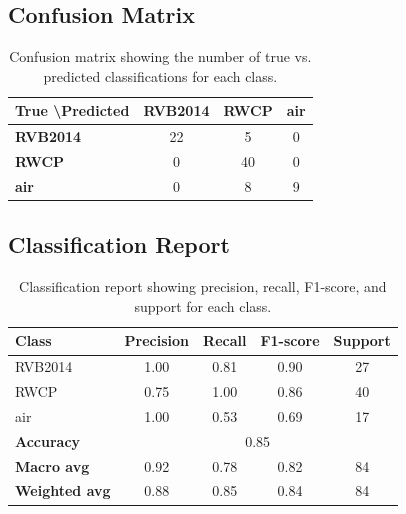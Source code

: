 \documentclass{article}
\begin{document}
\subsection{Confusion Matrix}
\begin{table}[H] %
\centering
\begin{tabular}{lccc}
\toprule
\textbf{True \textbackslash Predicted} & \textbf{RVB2014} & \textbf{RWCP} & \textbf{air} \\
\midrule
\textbf{RVB2014} & 22 & 5  & 0 \\
\textbf{RWCP} & 0  & 40 & 0 \\
\textbf{air} & 0  & 8  & 9 \\
\bottomrule
\end{tabular}
\caption{Confusion matrix showing the number of true vs. predicted classifications for each class.}
\label{tab:confusion_matrix}
\end{table}

\subsection{Classification Report}
\begin{table}[H] %
\centering
\begin{tabular}{lcccc}
\toprule
\textbf{Class} & \textbf{Precision} & \textbf{Recall} & \textbf{F1-score} & \textbf{Support} \\
\midrule
RVB2014 & 1.00 & 0.81 & 0.90 & 27 \\
RWCP & 0.75 & 1.00 & 0.86 & 40 \\
air & 1.00 & 0.53 & 0.69 & 17 \\
\midrule
\textbf{Accuracy} & \multicolumn{4}{c}{0.85} \\
\textbf{Macro avg} & 0.92 & 0.78 & 0.82 & 84 \\
\textbf{Weighted avg} & 0.88 & 0.85 & 0.84 & 84 \\
\bottomrule
\end{tabular}
\caption{Classification report showing precision, recall, F1-score, and support for each class.}
\label{tab:classification_report}
\end{table}
\end{document}
